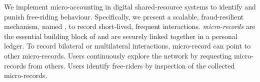 


We implement micro-accounting in digital shared-resource systems to identify and punish free-riding behaviour.
Specifically, we present a scalable, fraud-resilient mechanism, named \ModelName{}, to record short-lived, frequent interactions.
\emph{micro-records} are the essential building block of \ModelName{} and are securely linked together in a personal ledger.
To record bilateral or multilateral interactions, micro-record can point to other micro-records.
Users continuously explore the network by requesting micro-records from others.
Users identify free-riders by inspection of the collected micro-records.


